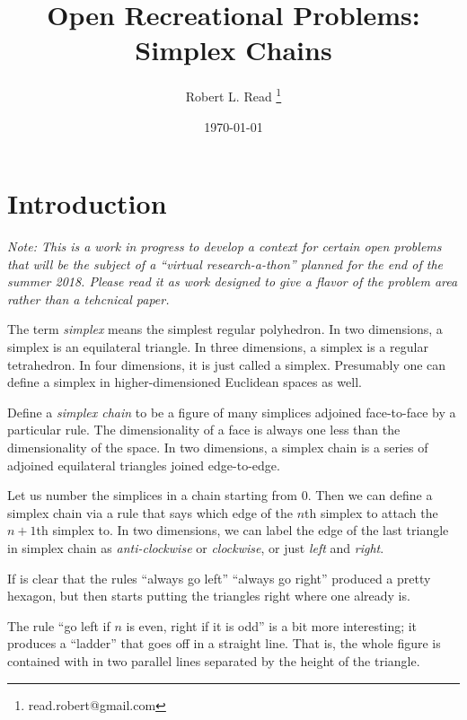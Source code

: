 \documentclass[11pt]{article}
\title{Open Recreational Problems: Simplex Chains}
\author{Robert L. Read
  \thanks{read.robert@gmail.com}
}
\affil{Founder, Public Invention, an educational non-profit.}
\date{\today}
\begin{document}
\maketitle


\section{Introduction}

{\em
Note: This is a work in progress to develop a context for certain open problems that will be the subject of a ``virtual research-a-thon'' planned for the end of the summer 2018.
Please read it as work designed to give a flavor of the problem area rather than a tehcnical paper.
}


The term {\em simplex} means the simplest regular polyhedron. In two dimensions, a simplex is an equilateral triangle.
In three dimensions, a simplex is a regular tetrahedron. In four dimensions, it is just called a simplex.
Presumably one can define a simplex in higher-dimensioned Euclidean spaces as well.

Define a {\em simplex chain} to be a figure of many simplices adjoined face-to-face by a particular rule.
The dimensionality of a face is always one less than the dimensionality of the space. In two dimensions,
a simplex chain is a series of adjoined equilateral triangles joined edge-to-edge.

Let us number the simplices in a chain starting from $0$. Then we can define a simplex chain via a rule
that says which edge of the $n$th simplex to attach the $n+1$th simplex to. In two dimensions, we can
label the edge of the last triangle in simplex chain as {\em anti-clockwise} or {\em clockwise}, or just
{\em left} and {\em right}.

If is clear that the rules ``always go left'' ``always go right'' produced a pretty hexagon, but then starts putting the triangles
right where one already is.

The rule ``go left if $n$ is even, right if it is odd'' is a bit more interesting; it produces a ``ladder'' that goes off
in a straight line. That is, the whole figure is contained with in two parallel lines separated by the height of the triangle.
\end{document}

